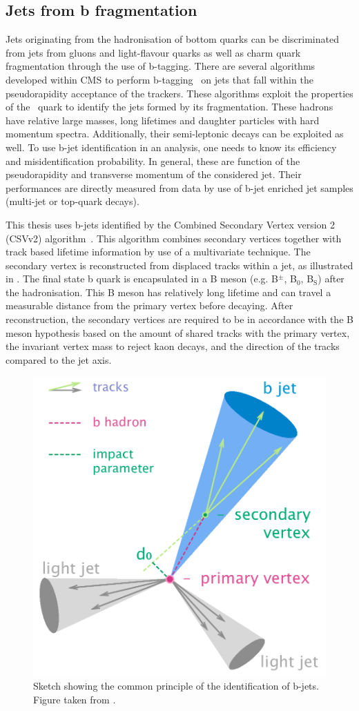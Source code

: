 \subsection{Jets from b fragmentation}
\label{sec:BJetID}
Jets originating from the hadronisation of bottom quarks can be discriminated from jets from gluons and light-flavour quarks as well as charm quark fragmentation through the use of b-tagging. There are several algorithms developed within CMS to perform b-tagging~\cite{1748-0221-8-04-P04013,CMS-PAS-BTV-15-001} on jets that fall within the pseudorapidity acceptance of the trackers. These algorithms exploit the properties of the \Pbottom\ quark to identify the jets formed by its fragmentation. These hadrons have relative large masses, long lifetimes and daughter particles with hard momentum spectra. Additionally, their semi-leptonic decays can be exploited as well.  To use b-jet identification in an analysis, one needs to know its efficiency and misidentification probability. In general, these are function of the pseudorapidity and transverse momentum of the considered jet. Their performances are directly measured from data by use of b-jet enriched jet samples (multi-jet or top-quark decays). 


This thesis uses b-jets identified by the Combined Secondary Vertex version 2 (CSVv2) algorithm~\cite{1748-0221-8-04-P04013}. This algorithm combines secondary vertices together with track based lifetime information by use of a multivariate technique. The secondary vertex is reconstructed from displaced tracks within a jet, as illustrated in . The final state b quark is encapsulated in a B meson (e.g. B$^{\pm}$, B$_0$, B$_{\mathrm{S}}$) after the hadronisation. This B meson has relatively long lifetime and can travel a measurable distance from the primary vertex before decaying. %
 After reconstruction, the secondary vertices are required to be in accordance with the B meson hypothesis based on the amount of shared tracks with the primary vertex, the invariant vertex mass to reject kaon decays, and the direction of the tracks compared to the jet axis. 
\begin{figure}[htbp]
	\centering
	\includegraphics[width=.5\linewidth]{4_EventRecoSelect/Figures/B-tagging_diagram}
	\caption{Sketch showing the common principle of the identification of b-jets. Figure taken from \cite{btagjet}.}
	\label{fig:btaggingdiagram}
\end{figure}

